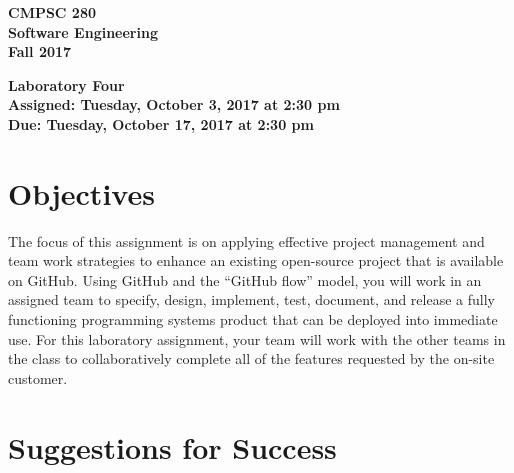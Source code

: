 \documentclass[11pt]{article}
\newcommand{\assignmentduedate}{October 17}
\newcommand{\assignmentassignedate}{October 3}
\newcommand{\assignmentnumber}{Four}
\newcommand{\labyear}{2017}
\newcommand{\labday}{Tuesday}
\newcommand{\labtime}{2:30 pm}
\newcommand{\assigneddate}{Assigned: \labday, \assignmentassignedate, \labyear{} at \labtime{}}
\newcommand{\duedate}{Due: \labday, \assignmentduedate, \labyear{} at \labtime{}}
\newcommand{\labtitle}[1]
{
  \begin{center}
    \begin{center}
      \bf
      CMPSC 280\\Software Engineering\\
      Fall 2017\\
      \medskip
    \end{center}
    \bf
    #1
  \end{center}
}
\begin{document}
\thispagestyle{empty}

\labtitle{Laboratory \assignmentnumber{} \\ \assigneddate{} \\ \duedate{}}

\section*{Objectives}

The focus of this assignment is on applying effective project management and team work strategies to enhance an existing
open-source project that is available on GitHub. Using GitHub and the ``GitHub flow'' model, you will work in an
assigned team to specify, design, implement, test, document, and release a fully functioning programming systems product
that can be deployed into immediate use. For this laboratory assignment, your team will work with the other teams in the
class to collaboratively complete all of the features requested by the on-site customer.

\section*{Suggestions for Success}
\end{document}
